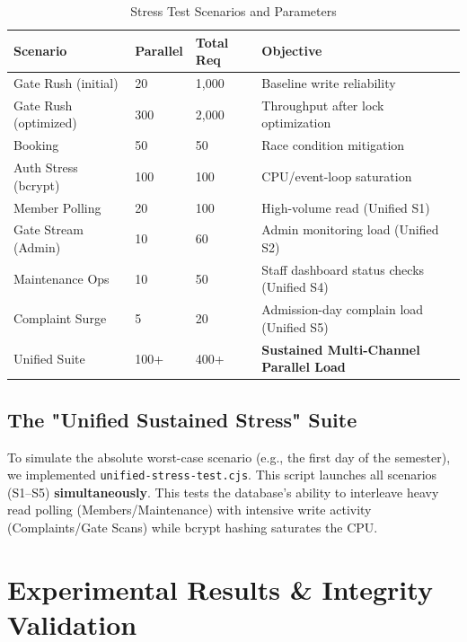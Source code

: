 \documentclass[sigconf]{acmart}
\newcommand{\theadbf}[1]{\textbf{#1}}
\begin{document}
\begin{table}[H]
\centering
\caption{Stress Test Scenarios and Parameters}
\label{tab:scenarios}
\small
\renewcommand{\arraystretch}{1.3}
\begin{tabular}{|L{2.2cm}|C{1cm}|C{1.2cm}|L{2.8cm}|}
\hline
{}\color{white}\theadbf{Scenario} & \color{white}\theadbf{Parallel} & \color{white}\theadbf{Total Req} & \color{white}\theadbf{Objective} \\
\hline
Gate Rush (initial) & 20 & 1,000 & Baseline write reliability \\
\hline
{}Gate Rush (optimized) & 300 & 2,000 & Throughput after lock optimization \\
\hline
Booking & 50 & 50 & Race condition mitigation \\
\hline
{}Auth Stress (bcrypt) & 100 & 100 & CPU/event-loop saturation \\
\hline
Member Polling & 20 & 100 & High-volume read (Unified S1) \\
\hline
{}Gate Stream (Admin) & 10 & 60 & Admin monitoring load (Unified S2) \\
\hline
Maintenance Ops & 10 & 50 & Staff dashboard status checks (Unified S4) \\
\hline
{}Complaint Surge & 5 & 20 & Admission-day complain load (Unified S5) \\
\hline
Unified Suite & 100+ & 400+ & \textbf{Sustained Multi-Channel Parallel Load} \\
\hline
\end{tabular}
\end{table}

\subsection{The "Unified Sustained Stress" Suite}
To simulate the absolute worst-case scenario (e.g., the first day of the semester), we implemented \texttt{unified-stress-test.cjs}. This script launches all scenarios (S1--S5) \textbf{simultaneously}. This tests the database's ability to interleave heavy read polling (Members/Maintenance) with intensive write activity (Complaints/Gate Scans) while bcrypt hashing saturates the CPU.



\section{Experimental Results \& Integrity Validation}
\end{document}
